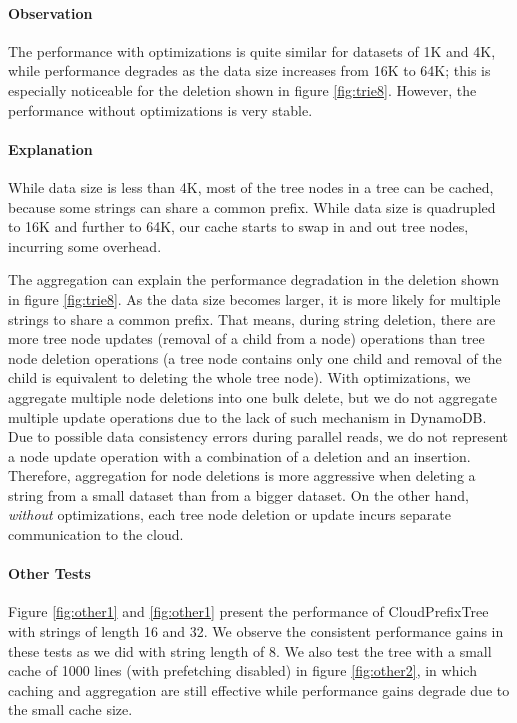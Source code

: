 \documentclass[10pt, conference, compsocconf]{IEEEtran}
\begin{document}
\paragraph{Observation}
The performance with optimizations is quite similar for datasets of 1K and 4K,
while performance degrades as the data size increases from 16K to 64K;
this is especially noticeable for the deletion shown in figure \ref{fig:trie8}.
However, the performance without optimizations is very stable.

\paragraph{Explanation}
While data size is less than 4K, most of the tree nodes in a tree can be cached, because
some strings can share a common prefix. While data size is quadrupled to 16K and further to 64K,
our cache starts to swap in and out tree nodes, incurring some overhead.

The aggregation can explain the performance degradation in the deletion shown in  
figure \ref{fig:trie8}. As the data size becomes larger, it is more likely for multiple strings to
share a common prefix. That means, during string deletion, there are more tree node updates (removal of a child from a node)
 operations than tree node deletion operations 
 (a tree node contains only one child and removal of the child is equivalent to deleting the whole tree node). 
 With optimizations, we aggregate multiple node deletions into one bulk delete, but we do not aggregate multiple update operations due to the 
 lack of such mechanism in DynamoDB. 
 Due to possible data consistency errors during parallel reads, we do not represent a node update operation with a combination of
 a deletion and an insertion.
 Therefore, aggregation for node deletions is more aggressive when deleting a string from a small dataset than from a bigger dataset.
 On the other hand, \emph{without} optimizations, each tree node deletion or update incurs separate communication to the cloud.
 

 \paragraph{Other Tests}Figure \ref{fig:other1} and \ref{fig:other1} present the performance
 of CloudPrefixTree with strings of length 16 and 32.  We observe the consistent performance gains in these tests as we did with string length of 8.
 We also test the tree with a small cache of 1000 lines (with
 prefetching disabled) in figure \ref{fig:other2}, in which caching and aggregation are still effective while performance gains
 degrade due to the small cache size.
 
\end{document}
